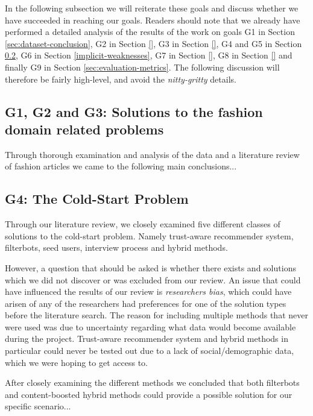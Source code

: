 In the following subsection we will reiterate these goals and discuss whether we have succeeded in reaching our goals. Readers should
note that we already have performed a detailed analysis of the results of the work on goals G1 in Section \ref{sec:dataset-conclusion},
G2 in Section \ref{}, G3 in Section \ref{}, G4 and G5 in Section \ref{sec:cold-start-discussion}, G6 in Section \ref{implicit-weaknesses},
G7 in Section \ref{}, G8 in Section \ref{} and finally G9 in Section \ref{sec:evaluation-metrics}.
The following discussion will therefore be fairly high-level, and avoid the \emph{nitty-gritty} details.

\subsection{G1, G2 and G3: Solutions to the fashion domain related problems}
\label{sec:fashion-discussion}

Through thorough examination and analysis of the data and a literature review of fashion articles we came to the following main conclusions...


\subsection{G4: The Cold-Start Problem}
\label{sec:cold-start-discussion}

Through our literature review, we closely examined five different classes of solutions to the cold-start problem. Namely trust-aware recommender system, filterbots, seed users, interview process and hybrid methods.

However, a question that should be asked is whether there exists and solutions which we did not discover or was excluded from our review. An issue that could have influenced the results of our review is \emph{researchers bias}, which could have arisen of any of the researchers had preferences for one of the solution types before the literature search. The reason for including multiple methods that never were used was due to uncertainty regarding what data would become available during the project. Trust-aware recommender system and hybrid methods in particular could never be tested out due to a lack of social/demographic data, which we were hoping to get access to.



After closely examining the different methods we concluded that both filterbots and content-boosted hybrid methods could provide a possible solution for
our specific scenario...

